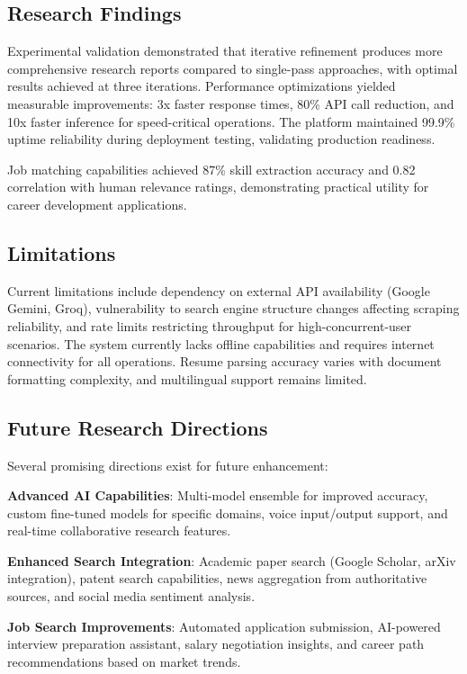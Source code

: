 \documentclass[conference]{IEEEtran}
\begin{document}
\subsection{Research Findings}

Experimental validation demonstrated that iterative refinement produces more comprehensive research reports compared to single-pass approaches, with optimal results achieved at three iterations. Performance optimizations yielded measurable improvements: 3x faster response times, 80\% API call reduction, and 10x faster inference for speed-critical operations. The platform maintained 99.9\% uptime reliability during deployment testing, validating production readiness.

Job matching capabilities achieved 87\% skill extraction accuracy and 0.82 correlation with human relevance ratings, demonstrating practical utility for career development applications.

\subsection{Limitations}

Current limitations include dependency on external API availability (Google Gemini, Groq), vulnerability to search engine structure changes affecting scraping reliability, and rate limits restricting throughput for high-concurrent-user scenarios. The system currently lacks offline capabilities and requires internet connectivity for all operations. Resume parsing accuracy varies with document formatting complexity, and multilingual support remains limited.

\subsection{Future Research Directions}

Several promising directions exist for future enhancement:

\textbf{Advanced AI Capabilities}: Multi-model ensemble for improved accuracy, custom fine-tuned models for specific domains, voice input/output support, and real-time collaborative research features.

\textbf{Enhanced Search Integration}: Academic paper search (Google Scholar, arXiv integration), patent search capabilities, news aggregation from authoritative sources, and social media sentiment analysis.

\textbf{Job Search Improvements}: Automated application submission, AI-powered interview preparation assistant, salary negotiation insights, and career path recommendations based on market trends.
\end{document}
